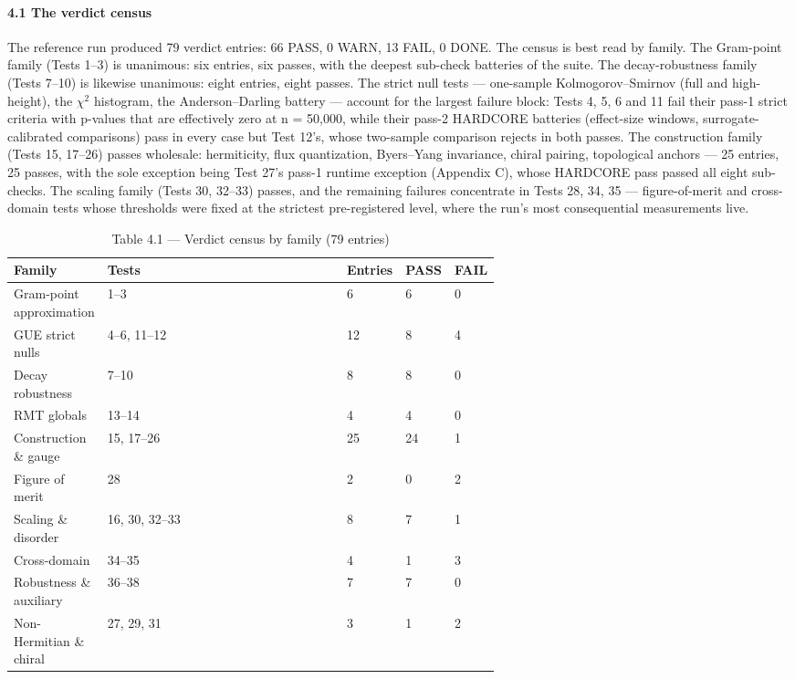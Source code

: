 \documentclass[10pt]{article}
\begin{document}
\paragraph{4.1 The verdict census}

The reference run produced 79 verdict entries: 66 PASS, 0 WARN, 13 FAIL, 0 DONE. The census is best read by family. The Gram-point family (Tests 1--3) is unanimous: six entries, six passes, with the deepest sub-check batteries of the suite. The decay-robustness family (Tests 7--10) is likewise unanimous: eight entries, eight passes. The strict null tests --- one-sample Kolmogorov--Smirnov (full and high-height), the $\chi$$^2$ histogram, the Anderson--Darling battery --- account for the largest failure block: Tests 4, 5, 6 and 11 fail their pass-1 strict criteria with p-values that are effectively zero at n = 50,000, while their pass-2 HARDCORE batteries (effect-size windows, surrogate-calibrated comparisons) pass in every case but Test 12's, whose two-sample comparison rejects in both passes. The construction family (Tests 15, 17--26) passes wholesale: hermiticity, flux quantization, Byers--Yang invariance, chiral pairing, topological anchors --- 25 entries, 25 passes, with the sole exception being Test 27's pass-1 runtime exception (Appendix C), whose HARDCORE pass passed all eight sub-checks. The scaling family (Tests 30, 32--33) passes, and the remaining failures concentrate in Tests 28, 34, 35 --- figure-of-merit and cross-domain tests whose thresholds were fixed at the strictest pre-registered level, where the run's most consequential measurements live.

\begin{table}[htbp]
\centering
\small
\caption{Table 4.1 --- Verdict census by family (79 entries)}
\begin{tabular}{lp{0.62\linewidth}lll}
\toprule
\textbf{Family} & \textbf{Tests} & \textbf{Entries} & \textbf{PASS} & \textbf{FAIL} \\
\midrule
Gram-point approximation & 1--3 & 6 & 6 & 0 \\
GUE strict nulls & 4--6, 11--12 & 12 & 8 & 4 \\
Decay robustness & 7--10 & 8 & 8 & 0 \\
RMT globals & 13--14 & 4 & 4 & 0 \\
Construction \& gauge & 15, 17--26 & 25 & 24 & 1 \\
Figure of merit & 28 & 2 & 0 & 2 \\
Scaling \& disorder & 16, 30, 32--33 & 8 & 7 & 1 \\
Cross-domain & 34--35 & 4 & 1 & 3 \\
Robustness \& auxiliary & 36--38 & 7 & 7 & 0 \\
Non-Hermitian \& chiral & 27, 29, 31 & 3 & 1 & 2 \\
\bottomrule
\end{tabular}
\end{table}
\end{document}
